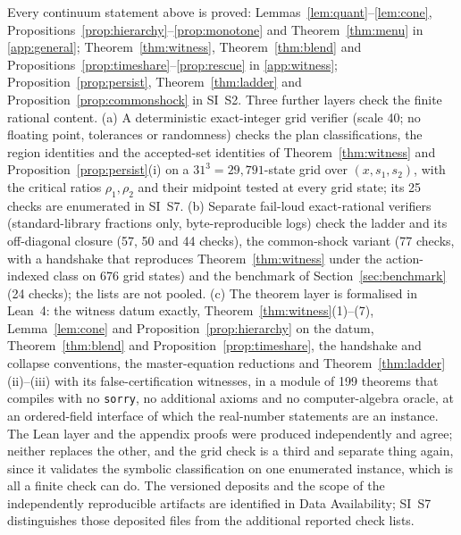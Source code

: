 Every continuum statement above is proved: Lemmas~\ref{lem:quant}--\ref{lem:cone}, Propositions~\ref{prop:hierarchy}--\ref{prop:monotone} and Theorem~\ref{thm:menu} in \ref{app:general}; Theorem~\ref{thm:witness}, Theorem~\ref{thm:blend} and Propositions~\ref{prop:timeshare}--\ref{prop:rescue} in \ref{app:witness}; Proposition~\ref{prop:persist}, Theorem~\ref{thm:ladder} and Proposition~\ref{prop:commonshock} in SI~S2. Three further layers check the finite rational content. (a) A deterministic exact-integer grid verifier (scale 40; no floating point, tolerances or randomness) checks the plan classifications, the region identities and the accepted-set identities of Theorem~\ref{thm:witness} and Proposition~\ref{prop:persist}(i) on a $31^3=29{,}791$-state grid over $(x,s_1,s_2)$, with the critical ratios $\rho_1,\rho_2$ and their midpoint tested at every grid state; its 25 checks are enumerated in SI~S7. (b) Separate fail-loud exact-rational verifiers (standard-library fractions only, byte-reproducible logs) check the ladder and its off-diagonal closure (57, 50 and 44 checks), the common-shock variant (77 checks, with a handshake that reproduces Theorem~\ref{thm:witness} under the action-indexed class on 676 grid states) and the benchmark of Section~\ref{sec:benchmark} (24 checks); the lists are not pooled. (c) The theorem layer is formalised in Lean~4: the witness datum exactly, Theorem~\ref{thm:witness}(1)--(7), Lemma~\ref{lem:cone} and Proposition~\ref{prop:hierarchy} on the datum, Theorem~\ref{thm:blend} and Proposition~\ref{prop:timeshare}, the handshake and collapse conventions, the master-equation reductions and Theorem~\ref{thm:ladder}(ii)--(iii) with its false-certification witnesses, in a module of 199 theorems that compiles with no \texttt{sorry}, no additional axioms and no computer-algebra oracle, at an ordered-field interface of which the real-number statements are an instance. The Lean layer and the appendix proofs were produced independently and agree; neither replaces the other, and the grid check is a third and separate thing again, since it validates the symbolic classification on one enumerated instance, which is all a finite check can do. The versioned deposits and the scope of the independently reproducible artifacts are identified in Data Availability; SI~S7 distinguishes those deposited files from the additional reported check lists.
